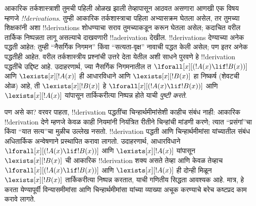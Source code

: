 \documentclass[../../../include/open-logic-section]{subfiles}
\begin{document}
आकारिक तर्कशास्त्राशी तुमची पहिली ओळख झाली तेव्हापासून आठवत असणारा
आणखी एक विषय म्हणजे \emph{!!{derivation}s}. तुम्ही आकारिक
तर्कशास्त्राचा पहिला अभ्यासक्रम घेतला असेल, तर तुमच्या शिक्षकांनी अशा
!!{derivation}s शोधण्याचा सराव तुमच्याकडून करून घेतला असेल; कदाचित
वरील तार्किक निष्पन्नता लागू असल्याचे दाखवणारी !!a{derivation} देखील.
!!{derivation}s देण्याच्या अनेक पद्धती आहेत: तुम्ही ``नैसर्गिक निगमन''
किंवा ``सत्यता-वृक्ष'' नावाची पद्धत केली असेल; पण इतर अनेक पद्धतीही
आहेत. वरील तर्कशास्त्रीय प्रश्नांची उत्तरे देता येतील अशी साधने पुरवणे
हे !!{derivation} पद्धतींचे उद्दिष्ट आहे. उदाहरणार्थ, ज्या नैसर्गिक
निगमनातील त $\lforall[x][(!A(x) \lif !B(x))]$ आणि
$\lexists[x][!A(x)]$ ही आधारविधाने आणि $\lexists[x][!B(x)]$ हा
निष्कर्ष (शेवटची ओळ) आहे, ती $\lexists[x][!B(x)]$ हे
$\lforall[x][(!A(x) \lif !B(x))]$ आणि $\lexists[x][!A(x)]$ यांपासून
तार्किकरीत्या निष्पन्न होते याची \emph{पुष्टी करते}.

पण असे का? वरवर पाहता, !!{derivation} पद्धतींचा चिन्हार्थमीमांसेशी
काहीच संबंध नाही: आकारिक !!{derivation} देणे म्हणजे केवळ काही
नियमांनी नियंत्रित रीतीने चिन्हांची मांडणी करणे; त्यात ``प्रसंगां''चा
किंवा ``यात सत्य''चा मुळीच उल्लेख नसतो. !!{derivation} पद्धती आणि
चिन्हार्थमीमांसा यांच्यातील संबंध अधितार्किक अन्वेषणाने प्रस्थापित
करावा लागतो. उदाहरणार्थ, आधारविधाने
$\lforall[x][(!A(x) \lif !B(x))]$ आणि $\lexists[x][!A(x)]$ यांपासून
$\lexists[x][!B(x)]$ ची आकारिक !!{derivation} शक्य असते तेव्हा आणि
केवळ तेव्हाच $\lforall[x][(!A(x) \lif !B(x))]$ आणि
$\lexists[x][!A(x)]$ ही दोन्ही मिळून
$\lexists[x][!B(x)]$ तार्किकरीत्या निष्पन्न करतात, याची गणितीय
सिद्धता आवश्यक आहे. मात्र, हे करता येण्यापूर्वी विन्यासमीमांसा आणि
चिन्हार्थमीमांसा यांच्या व्याख्या अचूक करण्याचे बरेच कष्टप्रद काम
करावे लागते.
\end{document}
